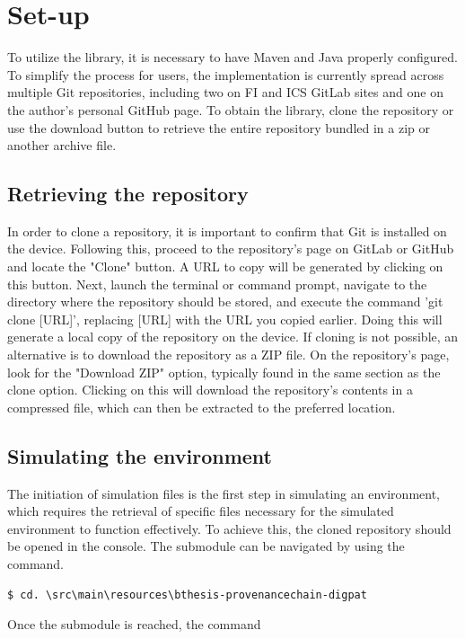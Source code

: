 \documentclass[
  digital,     %
  oneside,     %
  nosansbold,  %
  nocolorbold, %
  lof,         %
  lot,         %
]{fithesis4}
\begin{document}
\section{Set-up}
To utilize the library, it is necessary to have Maven and Java properly configured. To simplify the process for users, the implementation is currently spread across multiple Git repositories, including two on FI and ICS GitLab sites and one on the author's personal GitHub page. To obtain the library, clone the repository or use the download button to retrieve the entire repository bundled in a zip or another archive file.

\subsection{Retrieving the repository}
In order to clone a repository, it is important to confirm that Git is installed on the device. Following this, proceed to the repository's page on GitLab or GitHub and locate the "Clone" button. A URL to copy will be generated by clicking on this button. Next, launch the terminal or command prompt, navigate to the directory where the repository should be stored, and execute the command 'git clone [URL]', replacing [URL] with the URL you copied earlier. Doing this will generate a local copy of the repository on the device. If cloning is not possible, an alternative is to download the repository as a ZIP file. On the repository's page, look for the "Download ZIP" option, typically found in the same section as the clone option. Clicking on this will download the repository's contents in a compressed file, which can then be extracted to the preferred location.

\subsection{Simulating the environment}
The initiation of simulation files is the first step in simulating an environment, which requires the retrieval of specific files necessary for the simulated environment to function effectively. To achieve this, the cloned repository should be opened in the console. The submodule can be navigated by using the command.

\begin{verbatim}
$ cd. \src\main\resources\bthesis-provenancechain-digpat  
\end{verbatim}

Once the submodule is reached, the command 
\end{document}

